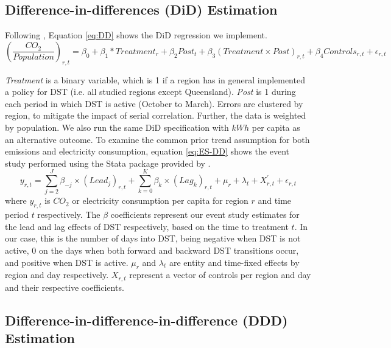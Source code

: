 \subsection{Difference-in-differences (DiD) Estimation}
Following \textcites{callaway_difference--differences_2021, goodman-bacon_difference--differences_2021}, Equation \ref{eq:DD} shows the \ac{DiD} regression we implement.
\begin{equation}
    \left(\frac{CO_2}{Population}\right)_{r,t}
 = \beta_0 + \beta_1*Treatment_{r} + \beta_2Post_{t} + \beta_3(Treatment \times Post)_{r,t} + \beta_4 Controls_{r,t}
     + \epsilon_{r,t}
     \label{eq:DD}
\end{equation}

\textit{Treatment} is a binary variable, which is 1 if a region has in general implemented a policy for \ac{DST} (i.e. all studied regions except Queensland). \textit{Post} is 1 during each period in which \ac{DST} is active (October to March). Errors are clustered by region, to mitigate the impact of serial correlation. Further, the data is weighted by population. We also run the same \ac{DiD} specification with $kWh$ per capita as an alternative outcome.
To examine the common prior trend assumption for both emissions and electricity consumption, equation \ref{eq:ES-DD} shows the event study performed using the Stata package provided by \textcite{clarke_implementing_2021}.
\begin{equation}
    y_{r,t} = \sum_{j=2}^{J} \beta_{-j} \times (Lead_j)_{r,t} + \sum_{k=0}^K \beta_{k} \times (Lag_k)_{r,t} + \mu_r + \lambda_t + X^{'}_{r,t} + \epsilon_{r,t}
    \label{eq:ES-DD}
\end{equation}
where $y_{r,t}$ is $CO_2$ or electricity consumption per capita for region $r$ and time period $t$ respectively. The $\beta$ coefficients represent our event study estimates for the lead and lag effects of DST respectively, based on the time to treatment $t$. In our case, this is the number of days into DST, being negative when DST is not active, 0 on the days when both forward and backward DST transitions occur, and positive when DST is active. $\mu_r$ and $\lambda_t$ are entity and time-fixed effects by region and day respectively. $X_{r,t}$ represent a vector of controls per region and day and their respective coefficients.  

\subsection{Difference-in-difference-in-difference (DDD) Estimation}

